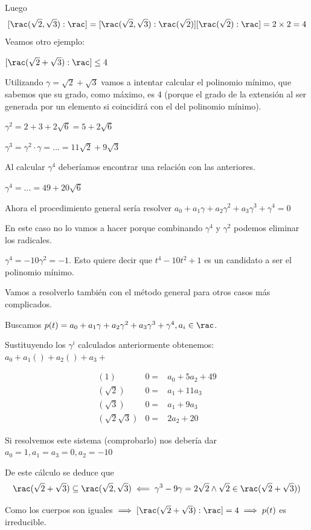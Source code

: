 \documentclass{apuntes}
\begin{document}
Luego \[[\rac(\sqrt{2},\sqrt{3}): \rac] = [\rac(\sqrt{2},\sqrt{3}): \rac(\sqrt{2})] [\rac(\sqrt{2}): \rac] = 2 \times 2 =  4\]
\newpage
Veamos otro ejemplo:
\begin{example}
$[\rac(\sqrt{2} + \sqrt{3}) : \rac] \leq 4$

Utilizando $\gamma = \sqrt{2} + \sqrt{3}$ vamos a intentar calcular el polinomio mínimo, que sabemos que su grado, como máximo, es 4 (porque el grado de la extensión al ser generada por un elemento si coincidirá con el del polinomio mínimo).

$\gamma^2 = 2+3+2\sqrt{6} = 5 + 2\sqrt{6}$

$\gamma^3 = \gamma^2 · \gamma = ... = 11 \sqrt{2} + 9\sqrt{3} $

Al calcular $\gamma^4$ deberíamos encontrar una relación con las anteriores.

$\gamma^4 = ... = 49 + 20\sqrt{6}$


Ahora el procedimiento general sería resolver $a_0 + a_1\gamma + a_2 \gamma^2 + a_3\gamma^3 + \gamma^4 = 0$

En este caso no lo vamos a hacer porque combinando $\gamma^4$ y $\gamma^2$ podemos eliminar los radicales.

$\gamma^4 = -10 \gamma^2 = -1$. Esto quiere decir que $t^4 - 10t^2 + 1$ es un candidato a ser el polinomio mínimo.

Vamos a resolverlo también con el método general para otros casos más complicados.

Buscamos $p(t) = a_0+a_1\gamma+a_2\gamma^2 + a_3\gamma^3 + \gamma^4, a_i\in\rac$.

Sustituyendo  los $\gamma^i$ calculados anteriormente obtenemos: $a_0 + a_1() + a_2() + a_3 + $

\[
\begin{array}{ccc}
(1) & 0 =& a_0 + 5a_2 + 49\\
(\sqrt{2}) & 0 =& a_1 + 11a_3\\
(\sqrt{3}) & 0 =& a_1 + 9a_3\\
(\sqrt{2}\sqrt{3}) & 0 =& 2a_2 + 20
\end{array}
\]

Si resolvemos este sistema (comprobarlo) nos debería dar $a_0 = 1, a_1=a_3=0,a_2 = -10$
\end{example}
\begin{corol}
De este cálculo se deduce que \[\rac(\sqrt{2} + \sqrt{3}) \subseteq \rac(\sqrt{2},\sqrt{3}) \impliedby \gamma^3 - 9\gamma = 2\sqrt{2} \wedge \sqrt{2}\in\rac(\sqrt{2} + \sqrt{3}))\]

Como los cuerpos son iguales $\implies [\rac(\sqrt{2}+\sqrt{3}) : \rac] = 4 \implies p(t)$ es irreducible.
\end{corol}
\end{document}
